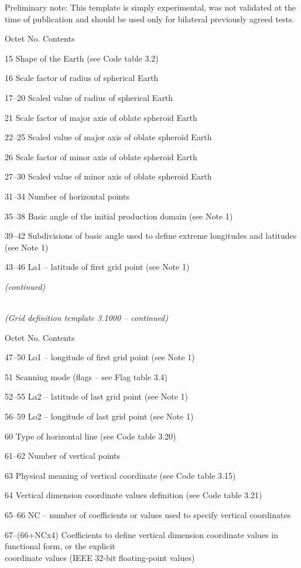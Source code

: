 Preliminary note: This template is simply experimental, was not validated at the time of publication and should be used only for bilateral previously agreed tests.

Octet No. Contents

15 Shape of the Earth (see Code table 3.2)

16 Scale factor of radius of spherical Earth

17--20 Scaled value of radius of spherical Earth

21 Scale factor of major axis of oblate spheroid Earth

22--25 Scaled value of major axis of oblate spheroid Earth

26 Scale factor of minor axis of oblate spheroid Earth

27--30 Scaled value of minor axis of oblate spheroid Earth

31--34 Number of horizontal points

35--38 Basic angle of the initial production domain (see Note 1)

39--42 Subdivisions of basic angle used to define extreme longitudes and latitudes (see Note 1)

43--46 La1 -- latitude of first grid point (see Note 1)

\emph{(continued)}

\emph{\\
(Grid definition template 3.1000 -- continued)}

Octet No. Contents

47--50 Lo1 -- longitude of first grid point (see Note 1)

51 Scanning mode (flags -- see Flag table 3.4)

52--55 La2 -- latitude of last grid point (see Note 1)

56--59 Lo2 -- longitude of last grid point (see Note 1)

60 Type of horizontal line (see Code table 3.20)

61--62 Number of vertical points

63 Physical meaning of vertical coordinate (see Code table 3.15)

64 Vertical dimension coordinate values definition (see Code table 3.21)

65--66 NC -- number of coefficients or values used to specify vertical coordinates

67--(66+NCx4) Coefficients to define vertical dimension coordinate values in functional form, or the explicit\\
coordinate values (IEEE 32-bit floating-point values)

